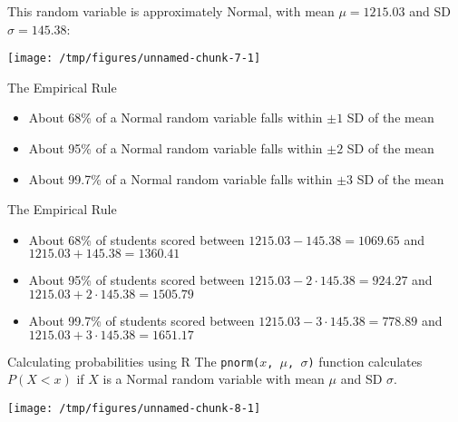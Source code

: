 \documentclass{beamer}\usepackage[]{graphicx}\usepackage[]{color}
\makeatletter
\def\maxwidth{ %
  \ifdim\Gin@nat@width>\linewidth
    \linewidth
  \else
    \Gin@nat@width
  \fi
}
\newenvironment{knitrout}{}{} %
\makeatother
\begin{document}
\begin{darkframes}
\begin{frame}[fragile]
\begin{knitrout}
\end{knitrout}
\end{frame}

\begin{frame}[fragile]
  This random variable is approximately \alert{Normal}, with mean $\mu=1215.03$ and SD $\sigma=145.38$:

\begin{knitrout}
\color{fgcolor}
\texttt{[image: /tmp/figures/unnamed-chunk-7-1]} 

\end{knitrout}
\end{frame}

\begin{frame}{The Empirical Rule}
  \begin{itemize}
    \item About 68\% of a Normal random variable falls within $\pm 1$ SD of the mean
    \item About 95\% of a Normal random variable falls within $\pm 2$ SD of the mean
    \item About 99.7\% of a Normal random variable falls within $\pm 3$ SD of the mean
  \end{itemize}
\end{frame}

\begin{frame}{The Empirical Rule}
  \begin{itemize}[<+->]
    \item About 68\% of students scored between $1215.03 - 145.38 = 1069.65$ and $1215.03 + 145.38  = 1360.41$
    \item About 95\% of students scored between $1215.03 - 2\cdot145.38 = 924.27$ and $1215.03 + 2\cdot145.38  = 1505.79$
    \item About 99.7\% of students scored between $1215.03 - 3\cdot145.38 = 778.89$ and $1215.03 + 3\cdot145.38  = 1651.17$
  \end{itemize}
\end{frame}

\begin{frame}[fragile]{Calculating probabilities using R}
  The \texttt{pnorm($x$, $\mu$, $\sigma$)} function calculates $P(X < x)$ if $X$ is a Normal random variable with mean $\mu$ and SD $\sigma$.
\end{frame}

\begin{frame}
\begin{knitrout}
\color{fgcolor}
\texttt{[image: /tmp/figures/unnamed-chunk-8-1]} 


\end{knitrout}
\end{frame}
\end{darkframes}
\end{document}

